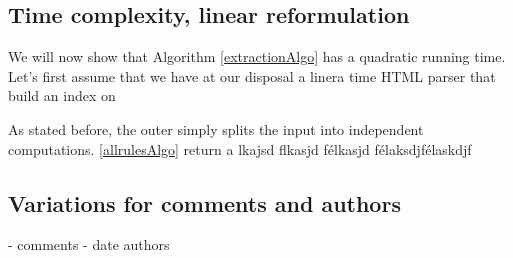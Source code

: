 \similarityAlgo

\subsection{Time complexity, linear reformulation}

We will now show that Algorithm \ref{extractionAlgo} has a quadratic running time. Let's first assume that we have at our disposal a linera time HTML parser that build an index on

As stated before, the outer simply splits the input into independent computations. \ref{allrulesAlgo} return a lkajsd flkasjd félkasjd félaksdjfélaskdjf







\subsection{Variations for comments and authors}
- comments
- date authors
